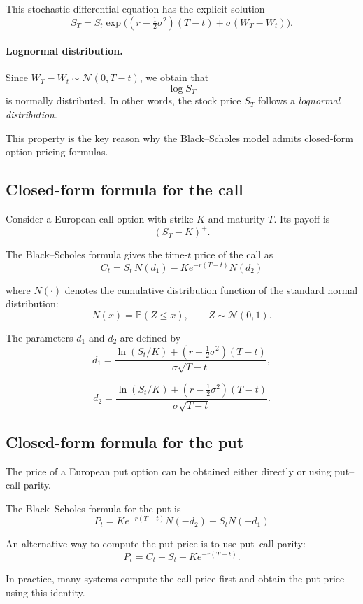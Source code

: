 \documentclass[11pt]{article}
\newcommand{\Pbb}{\mathbb{P}}
\newcommand{\1}{\mathbf{1}}
\theoremstyle{plain}
\theoremstyle{definition}
\theoremstyle{remark}
\begin{document}
This stochastic differential equation has the explicit solution
\[
S_T
=
S_t\exp\!\Big(
(r-\tfrac12\sigma^2)(T-t)+\sigma(W_T-W_t)
\Big).
\]

\paragraph{Lognormal distribution.}

Since \(W_T-W_t\sim \mathcal{N}(0,T-t)\), we obtain that
\[
\log S_T
\]
is normally distributed. In other words, the stock price \(S_T\) follows
a \emph{lognormal distribution}.

This property is the key reason why the Black--Scholes model admits
closed-form option pricing formulas.

\subsection{Closed-form formula for the call}

Consider a European call option with strike \(K\) and maturity \(T\).
Its payoff is
\[
(S_T-K)^+ .
\]

The Black--Scholes formula gives the time-\(t\) price of the call as
\[
\boxed{
C_t
=
S_t\,N(d_1)
-
K e^{-r(T-t)} N(d_2)
}
\]

where \(N(\cdot)\) denotes the cumulative distribution function of the
standard normal distribution:
\[
N(x)=\Pbb(Z\le x), \qquad Z\sim\mathcal{N}(0,1).
\]

The parameters \(d_1\) and \(d_2\) are defined by
\[
d_1=
\frac{\ln(S_t/K)+(r+\tfrac12\sigma^2)(T-t)}
{\sigma\sqrt{T-t}},
\]

\[
d_2=
\frac{\ln(S_t/K)+(r-\tfrac12\sigma^2)(T-t)}
{\sigma\sqrt{T-t}}.
\]

\subsection{Closed-form formula for the put}

The price of a European put option can be obtained either directly
or using put--call parity.

The Black--Scholes formula for the put is
\[
\boxed{
P_t
=
K e^{-r(T-t)} N(-d_2)
-
S_t N(-d_1)
}
\]

An alternative way to compute the put price is to use
put--call parity:
\[
P_t = C_t - S_t + K e^{-r(T-t)}.
\]

In practice, many systems compute the call price first and obtain the
put price using this identity.
\end{document}
